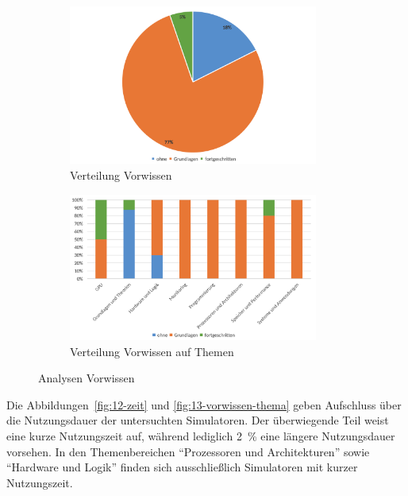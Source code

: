 \begin{figure}[!htbp]
    \centering
    \begin{subfigure}[b]{0.48\textwidth}
        \centering
        \includegraphics[width=0.90\textwidth]{graphics_sim/10-vorwissen.png}
        \caption{Verteilung Vorwissen}
        \label{fig:10-vorwissen}
    \end{subfigure}
    \hfill
    \begin{subfigure}[b]{0.48\textwidth}
        \centering
        \includegraphics[width=0.90\textwidth]{graphics_sim/11-vorwissen-thema.png}
        \caption{Verteilung Vorwissen auf Themen}
        \label{fig:11-vorwissen-thema}
    \end{subfigure}
    \caption{Analysen Vorwissen}
    \label{fig:vorwissen-gesamt}
\end{figure}

Die Abbildungen~\ref{fig:12-zeit} und \ref{fig:13-vorwissen-thema} geben Aufschluss über die Nutzungsdauer der untersuchten Simulatoren. Der überwiegende Teil weist eine kurze Nutzungszeit auf, während lediglich 2~\% eine längere Nutzungsdauer vorsehen. In den Themenbereichen \enquote{Prozessoren und Architekturen} sowie \enquote{Hardware und Logik} finden sich ausschließlich Simulatoren mit kurzer Nutzungszeit.

